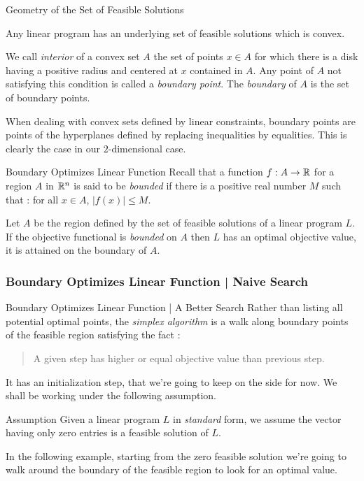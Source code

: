 \documentclass[32pt, aspectratio = 169]{beamer}
\begin{document}
\begin{frame}{Geometry of the Set of Feasible Solutions}
  \begin{prop}
    Any linear program has an underlying set of feasible solutions
    which is convex.
  \end{prop}
  \begin{defn}
    We call \emph{interior} of a convex set $A$ the set of points
    $x \in A$ for which there is a disk having a positive radius and
    centered at $x$ contained in $A$. Any point of $A$ not satisfying
    this condition is called a \emph{boundary point}. The
    \emph{boundary} of $A$ is the set of boundary points.
  \end{defn}
  When dealing with convex sets defined by linear constraints,
  boundary points are points of the hyperplanes defined by replacing
  inequalities by equalities. This is clearly the case in our
  $2$-dimensional case.
\end{frame}

\begin{frame}{Boundary Optimizes Linear Function}
  Recall that a function $f : A \to \mathbb{R}$ for a region $A$ in $\mathbb{R}^n$ is
  said to be \emph{bounded} if there is a positive real number $M$
  such that : for all $x \in A$, $\Big|f(x)\Big| \leq M$.
  \begin{prop}
    Let $A$ be the region defined by the set of feasible solutions of
    a linear program $L$. If the objective functional is
    \textit{bounded} on $A$ then $L$ has an optimal objective value,
    it is attained on the boundary of $A$.
    \end{prop}
\end{frame}

\begin{frame}
  \frametitle{Boundary Optimizes Linear Function | Naive Search}
\end{frame}

\begin{frame}{Boundary Optimizes Linear Function | A Better Search}
  Rather than listing all potential optimal points, the \emph{simplex
    algorithm} is a walk along boundary points of the feasible region
  satisfying the fact :
  \begin{quotation}
    A given step has higher or equal objective value than previous
    step.
  \end{quotation}
  It has an initialization step, that we're going to keep on the side
  for now. \pause We shall be working under the following assumption.
  \begin{alertblock}{Assumption}
    Given a linear program $L$ in \textit{standard} form, we assume
    the vector having only zero entries is a feasible solution of $L$.
  \end{alertblock}
  In the following example, starting from the zero feasible solution
  we're going to walk around the boundary of the feasible region to
  look for an optimal value.
\end{frame}
\end{document}
